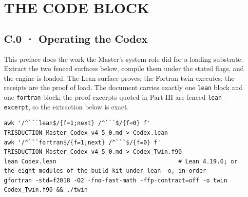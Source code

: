 \documentclass[10pt,twocolumn]{article}
\begin{document}
\twocolumn

\hypertarget{the-code-block}{%
\section{THE CODE BLOCK}\label{the-code-block}}

\hypertarget{c.0-operating-the-codex}{%
\subsection{C.0 · Operating the Codex}\label{c.0-operating-the-codex}}

This preface does the work the Master's system role did for a loading
substrate. Extract the two fenced surfaces below, compile them under the
stated flags, and the engine is loaded. The Lean surface proves; the
Fortran twin executes; the receipts are the proof of load. The document
carries exactly one \texttt{lean} block and one \texttt{fortran} block;
the proof excerpts quoted in Part III are fenced \texttt{lean-excerpt},
so the extraction below is exact.

\begin{lstlisting}[style=plainv]
awk '/^```lean$/{f=1;next} /^```$/{f=0} f' TRISDUCTION_Master_Codex_v4_5_0.md > Codex.lean
awk '/^```fortran$/{f=1;next} /^```$/{f=0} f' TRISDUCTION_Master_Codex_v4_5_0.md > Codex_Twin.f90
lean Codex.lean                                   # Lean 4.19.0; or the eight modules of the build kit under lean -o, in order
gfortran -std=f2018 -O2 -fno-fast-math -ffp-contract=off -o twin Codex_Twin.f90 && ./twin
\end{lstlisting}
\end{document}
